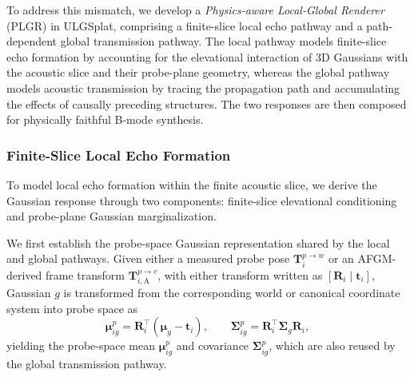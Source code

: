 To address this mismatch, we develop a \emph{Physics-aware Local-Global
Renderer} (PLGR) in ULGSplat, comprising a finite-slice local echo pathway and
a path-dependent global transmission pathway. The local pathway models
finite-slice echo formation by accounting for the elevational interaction of
3D Gaussians with the acoustic slice and their probe-plane geometry, whereas
the global pathway models acoustic transmission by tracing the propagation
path and accumulating the effects of causally preceding structures. The two
responses are then composed for physically faithful B-mode synthesis.

\subsubsection{Finite-Slice Local Echo Formation}

To model local echo formation within the finite acoustic slice, we derive the
Gaussian response through two components: finite-slice elevational
conditioning and probe-plane Gaussian marginalization.

We first establish the probe-space Gaussian representation shared by the local
and global pathways. Given either a measured probe pose
$\mathbf T_i^{p\rightarrow w}$ or an AFGM-derived frame transform
$\mathbf T_{i,\mathrm A}^{p\rightarrow c}$, with either transform written as
$[\mathbf R_i\mid\mathbf t_i]$, Gaussian $g$ is transformed from the
corresponding world or canonical coordinate system into probe space as
\begin{equation}
\boldsymbol\mu^{p}_{ig}
=
\mathbf R_i^\top
\left(
\boldsymbol\mu_g-\mathbf t_i
\right),
\qquad
\boldsymbol\Sigma^{p}_{ig}
=
\mathbf R_i^\top
\boldsymbol\Sigma_g
\mathbf R_i,
\label{eq:probe-space-gaussian}
\end{equation}
yielding the probe-space mean
$\boldsymbol\mu^{p}_{ig}$ and covariance
$\boldsymbol\Sigma^{p}_{ig}$, which are also reused by the global transmission
pathway.


